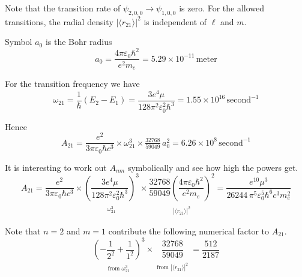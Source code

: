 \documentclass[12pt]{article}
\begin{document}
\medskip
\noindent
Note that the transition rate of $\psi_{2,0,0}\rightarrow\psi_{1,0,0}$ is zero.
For the allowed transitions, the radial density
$|\langle r_{21}\rangle|^2$ is independent of $\ell$ and $m$.

\bigskip
\noindent
Symbol $a_0$ is the Bohr radius
\begin{equation*}
a_0=\frac{4\pi\varepsilon_0\hbar^2}{e^2 m_e}
=5.29\times10^{-11}\,\text{meter}
\end{equation*}

\bigskip
\noindent
For the transition frequency we have
\begin{equation*}
\omega_{21}=\frac{1}{\hbar}(E_2-E_1)=\frac{3e^4\mu}{128\pi^2\varepsilon_0^2\hbar^3}
=1.55\times10^{16}\,\text{second}^{-1}
\end{equation*}

\noindent
Hence
\begin{equation*}
A_{21}=\frac{e^2}{3\pi\varepsilon_0\hbar c^3}
\times
\omega_{21}^3
\times
\tfrac{32768}{59049}\,a_0^2
=6.26\times10^8\,\text{second}^{-1}
\end{equation*}

\noindent
It is interesting to work out $A_{nm}$ symbolically and see how high the powers get.
\begin{equation*}
A_{21}=\frac{e^2}{3\pi\varepsilon_0\hbar c^3}
\times
\underset{\substack{\\[1ex]\omega_{21}^3}}
{\left(\frac{3e^4\mu}{128\pi^2\varepsilon_0^2\hbar^3}\right)^3}
\times
\underset{\substack{\\[1ex]|\langle r_{21}\rangle|^2}}
{\frac{32768}{59049}
\left(\frac{4\pi\varepsilon_0\hbar^2}{e^2 m_e}\right)^2}
=\frac{e^{10}\mu^3}{26244\,\pi^5\varepsilon_0^5\hbar^6 c^3 m_e^2}
\end{equation*}

\noindent
Note that $n=2$ and $m=1$ contribute the following numerical factor to $A_{21}$.
\begin{equation*}
\underset{\substack{\\[1ex]\text{from $\omega_{21}^3$}}}
{\left(-\frac{1}{2^2}+\frac{1}{1^2}\right)^3}
\times
\underset{\substack{\\[1ex]\text{from $|\langle r_{21}\rangle|^2$}}}
{\frac{32768}{59049}}
=\frac{512}{2187}
\end{equation*}
\end{document}
